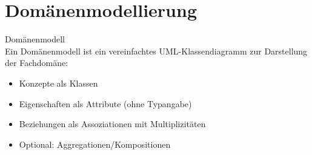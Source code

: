 \section{Domänenmodellierung}

\begin{concept}{Domänenmodell}\\
Ein Domänenmodell ist ein vereinfachtes UML-Klassendiagramm zur Darstellung der Fachdomäne:
\begin{itemize}
    \item Konzepte als Klassen
    \item Eigenschaften als Attribute (ohne Typangabe)
    \item Beziehungen als Assoziationen mit Multiplizitäten
    \item Optional: Aggregationen/Kompositionen
\end{itemize}
\end{concept}


